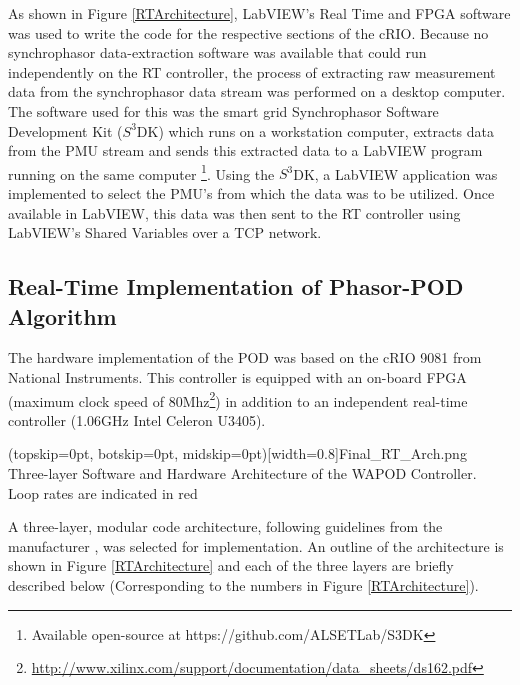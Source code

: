 \documentclass{ieeeaccess}
\begin{document}
As shown in Figure \ref{RTArchitecture}, LabVIEW's Real Time and FPGA software was used to write the code for the respective sections of the cRIO. Because no synchrophasor data-extraction software was available that could run independently on the RT controller, the process of extracting raw measurement data from the synchrophasor data stream was performed on a desktop computer. The software used for this was the smart grid Synchrophasor Software Development Kit ($S^{3}$DK) \cite{SDK} which runs on a workstation computer, extracts data from the PMU stream and sends this extracted data to a LabVIEW program running on the same computer \footnote{Available open-source at https://github.com/ALSETLab/S3DK}. Using the $S^{3}$DK, a LabVIEW application was implemented to select the PMU\rq{s} from which the data was to be utilized. Once available in LabVIEW, this data was then sent to the RT controller using LabVIEW\rq{s} Shared Variables \cite{LabViewManuals} over a TCP network.

\subsection{Real-Time Implementation of Phasor-POD Algorithm}
The hardware implementation of the POD was based on the cRIO 9081 \cite{cRIO9081} from National Instruments. This controller is equipped with an on-board FPGA (maximum clock speed of 80Mhz\footnote{\underline{http://www.xilinx.com/support/documentation/data\_sheets/ds162.pdf}}) in addition to an independent real-time controller (1.06GHz Intel Celeron U3405). 

\Figure[t!](topskip=0pt, botskip=0pt, midskip=0pt)[width=0.8\textwidth]{Final_RT_Arch.png}
{Three-layer Software and Hardware Architecture of the WAPOD Controller. Loop rates are indicated in red\label{RTArchitecture}}

A three-layer, modular code architecture\cite{Rebello_WAPOD_Software}, following guidelines from the manufacturer \cite{LabviewTemplate}, was selected for implementation. An outline of the architecture is shown in Figure \ref{RTArchitecture} and each of the three layers are briefly described below (Corresponding to the numbers in Figure \ref{RTArchitecture}). 
\end{document}
